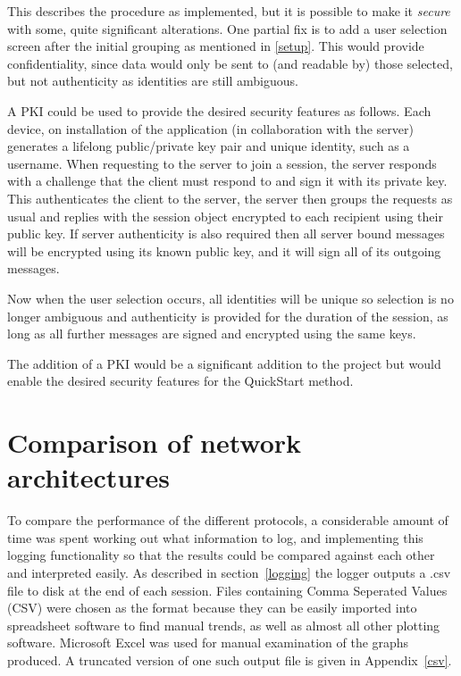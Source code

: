 This describes the procedure as implemented, but it is possible to make it \emph{secure} with some, quite significant alterations.
One partial fix is to add a user selection screen after the initial grouping as mentioned in \ref{setup}. This would provide confidentiality, since data would only be sent to (and readable by) those selected, but not authenticity as identities are still ambiguous.

A PKI could be used to provide the desired security features as follows. Each device, on installation of the application (in collaboration with the server) generates a lifelong public/private key pair and unique identity, such as a username. When requesting to the server to join a session, the server responds with a challenge that the client must respond to and sign it with its private key. This authenticates the client to the server, the server then groups the requests as usual and replies with the session object encrypted to each recipient using their public key. If server authenticity is also required then all server bound messages will be encrypted using its known public key, and it will sign all of its outgoing messages.

Now when the user selection occurs, all identities will be unique so selection is no longer ambiguous and authenticity is provided for the duration of the session, as long as all further messages are signed and encrypted using the same keys.

The addition of a PKI would be a significant addition to the project but would enable the desired security features for the QuickStart method.

\section{Comparison of network architectures}

To compare the performance of the different protocols, a considerable amount of time was spent working out what information to log, and implementing this logging functionality so that the results could be compared against each other and interpreted easily.
As described in section~\ref{logging} the logger outputs a .csv file to disk at the end of each session. Files containing Comma Seperated Values (CSV) were chosen as the format because they can be easily imported into spreadsheet software to find manual trends, as well as almost all other plotting software. Microsoft Excel was used for manual examination of the graphs produced.
A truncated version of one such output file is given in Appendix~\ref{csv}.

